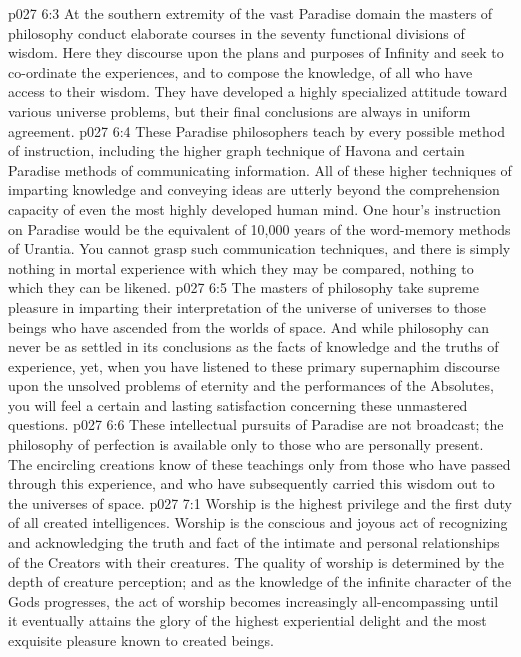 \vs p027 6:3 At the southern extremity of the vast Paradise domain the masters of philosophy conduct elaborate courses in the seventy functional divisions of wisdom. Here they discourse upon the plans and purposes of Infinity and seek to co\hyp{}ordinate the experiences, and to compose the knowledge, of all who have access to their wisdom. They have developed a highly specialized attitude toward various universe problems, but their final conclusions are always in uniform agreement.
\vs p027 6:4 These Paradise philosophers teach by every possible method of instruction, including the higher graph technique of Havona and certain Paradise methods of communicating information. All of these higher techniques of imparting knowledge and conveying ideas are utterly beyond the comprehension capacity of even the most highly developed human mind. One hour’s instruction on Paradise would be the equivalent of 10,000 years of the word\hyp{}memory methods of Urantia. You cannot grasp such communication techniques, and there is simply nothing in mortal experience with which they may be compared, nothing to which they can be likened.
\vs p027 6:5 The masters of philosophy take supreme pleasure in imparting their interpretation of the universe of universes to those beings who have ascended from the worlds of space. And while philosophy can never be as settled in its conclusions as the facts of knowledge and the truths of experience, yet, when you have listened to these primary supernaphim discourse upon the unsolved problems of eternity and the performances of the Absolutes, you will feel a certain and lasting satisfaction concerning these unmastered questions.
\vs p027 6:6 These intellectual pursuits of Paradise are not broadcast; the philosophy of perfection is available only to those who are personally present. The encircling creations know of these teachings only from those who have passed through this experience, and who have subsequently carried this wisdom out to the universes of space.
\vs p027 7:1 Worship is the highest privilege and the first duty of all created intelligences. Worship is the conscious and joyous act of recognizing and acknowledging the truth and fact of the intimate and personal relationships of the Creators with their creatures. The quality of worship is determined by the depth of creature perception; and as the knowledge of the infinite character of the Gods progresses, the act of worship becomes increasingly all\hyp{}encompassing until it eventually attains the glory of the highest experiential delight and the most exquisite pleasure known to created beings.
